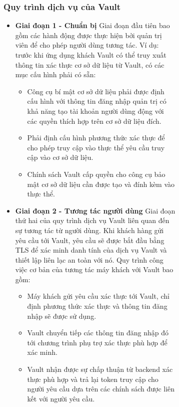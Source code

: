 \documentclass[12pt,a4paper]{report}
\begin{document}
\begin{figure}[htp]
\begin{figure}[htp]
	\subsubsection{Quy trình dịch vụ của Vault}
	\hspace{1.0cm}{Có nhiều khía cạnh để chuẩn bị cho Vault xử lý các yêu cầu của khách hàng hàng ngày. Nói chung, có ba giai đoạn để chuẩn bị môi trường Vault sẵn sàng sản xuất: cấu hình, tương tác với máy khách và các sự kiện sau máy khách. Mỗi giai đoạn đều cần thiết để xây dựng một môi trường hoạt động Vault.}
	\begin{itemize}
		\item \textbf{Giai đoạn 1 - Chuẩn bị}
		\smallskip
		\subitem
		{Giai đoạn đầu tiên bao gồm các hành động được thực hiện bởi quản trị viên để cho phép người dùng tương tác. Ví dụ: trước khi ứng dụng khách Vault có thể truy xuất thông tin xác thực cơ sở dữ liệu từ Vault, có các mục cấu hình phải có sẵn:}
		\begin{itemize}
			\item
			{Công cụ bí mật cơ sở dữ liệu phải được định cấu hình với thông tin đăng nhập quản trị có khả năng tạo tài khoản người dùng động với các quyền thích hợp trên cơ sở dữ liệu đích.}
			\item
			{Phải định cấu hình phương thức xác thực để cho phép truy cập vào thực thể yêu cầu truy cập vào cơ sở dữ liệu.}
			\item
			{Chính sách Vault cấp quyền cho công cụ bảo mật cơ sở dữ liệu cần được tạo và đính kèm vào thực thể.}
		\end{itemize}
		\item \textbf{Giai đoạn 2 - Tương tác người dùng}
		\smallskip
		\subitem
		{Giai đoạn thứ hai của quy trình dịch vụ Vault liên quan đến sự tương tác từ người dùng. Khi khách hàng gửi yêu cầu tới Vault, yêu cầu sẽ được bắt đầu bằng TLS để xác minh danh tính của dịch vụ Vault và thiết lập liên lạc an toàn với nó. Quy trình công việc cơ bản của tương tác máy khách với Vault bao gồm:}
		\begin{itemize}
			\item {Máy khách gửi yêu cầu xác thực tới Vault, chỉ định phương thức xác thực và thông tin đăng nhập sẽ được sử dụng.}
			\item {Vault chuyển tiếp các thông tin đăng nhập đó tới chương trình phụ trợ xác thực phù hợp để xác minh.}
			\item {Vault nhận được sự chấp thuận từ backend xác thực phù hợp và trả lại token truy cập cho người yêu cầu dựa trên các chính sách được liên kết với người yêu cầu.}

\end{itemize}
\end{itemize}
\end{figure}
\end{figure}
\end{document}
